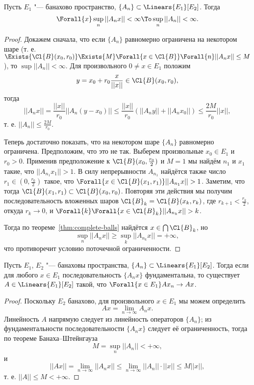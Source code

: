 \documentclass[main]{subfiles}
\begin{document}
\begin{theorem}\label{thm:operators-bsh}
  Пусть \( E_1 \) "--- банахово пространство,
  \( \{ A_n \} \subset \Linears{E_1}[E_2] \).
  Тогда
  \[
    \Forall{x} \sup_n ||A_n x || < \infty
    \To
    \sup_n ||A_n|| < \infty.
  \]
\end{theorem}
\begin{proof}
  Докажем сначала, что
  если \( \{ A_n \} \) равномерно ограничена
  на некотором шаре
  (т. е. \( \Exists{\Cl{B}(x_0, r_0)} \Exists{M}
  \Forall{x \in \Cl{B}} \Forall{n} ||A_n x|| \le M \)),
  то \( \sup ||A_n|| < \infty \).
  Для произвольного \( 0 \ne x \in E_1 \) положим
  \[
    y = x_0 + r_0 \frac{x}{||x||} \in \Cl{B}(x_0, r_0),
  \]
  тогда
  \[
    ||A_n x|| = \frac{||x||}{r_0} ||A_n (y - x_0)|| \le
    \frac{||x||}{r_0} (||A_n y|| + ||A_n x_0||) \le
    \frac{2 M}{r_0} ||x||,
  \]
  т. е. \( ||A_n|| \le \frac{2M}{r_0} \).

  Теперь достаточно показать, что на некотором
  шаре \( \{ A_n \} \) равномерно ограничена.
  Предположим, что это не так. Выберем произвольные
  \( x_0 \in E_1 \) и \( r_0 > 0 \).
  Применив предположение к \( \Cl{B}(x_0, \frac{r_0}{2}) \)
  и \( M = 1 \) мы найдём \( n_1 \) и \( x_1 \) такие,
  что \( ||A_{n_1} x_1|| > 1 \).
  В силу непрерывности \( A_{n_1} \)
  найдётся также число \( r_1 \in (0, \frac{r_0}{2}) \)
  такое, что \( \Forall{x \in \Cl{B}(x_1, r_1)} ||A_{n_1} x|| > 1 \).
  Заметим, что тогда \( \Cl{B}(x_1, r_1) \subset \Cl{B}(x_0, r_0) \).
  Повторяя эти действия мы получим последовательность
  вложенных шаров \( \Cl{B}_k = \Cl{B}(x_k, r_k) \), где
  \( r_{k + 1} < \frac{r_k}{2} \), откуда \( r_k \to 0 \),
  и \( \Forall{k} \Forall{x \in \Cl{B}_k} ||A_{n_k} x|| > k \).

  Тогда по теореме~\ref{thm:complete-balls}
  найдётся \( x \in \bigcap \Cl{B}_k \),
  но
  \[
    \sup_n ||A_n x|| \ge \sup_k ||A_{n_k} x|| = +\infty,
  \]
  что противоречит условию поточечной ограниченности.
\end{proof}

\begin{theorem}
  Пусть \( E_1 \), \( E_2 \) "--- банаховы пространства,
  \( \{ A_n \} \subset \Linears{E_1}[E_2] \).
  Тогда если для любого \( x \in E_1 \)
  последовательность \( \{ A_n x \} \) фундаментальна,
  то существует \( A \in \Linears{E_1}[E_2] \) такой,
  что \( \Forall{x \in E_1} A x_n \to A x \).
\end{theorem}
\begin{proof}
  Поскольку \( E_2 \) банахово,
  для произвольного \( x \in E_1 \)
  мы можем определить
  \[
    Ax = \lim_{n \to \infty} A_n x.
  \]
  Линейность \( A \) напрямую следует
  из линейность операторов \( \{ A_n \} \);
  из фундаментальности последовательности \( \{ A_n x \} \)
  следует её ограниченность,
  тогда по теореме Банаха--Штейнгауза
  \[
    M = \sup_n ||A_n|| < +\infty,
  \]
  и
  \[
    ||A x|| =
    \lim_{n \to \infty} ||A_n x|| \le
    \lim_{n \to \infty} ||A_n|| \cdot ||x|| \le
    M ||x||,
  \]
  т. е. \( ||A|| \le M < +\infty \).
\end{proof}
\end{document}
